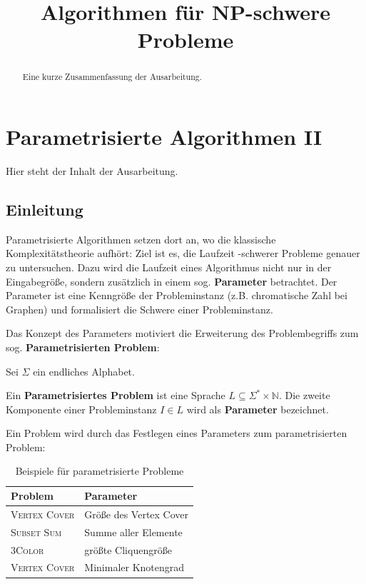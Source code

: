 \documentclass[a4paper,ngerman]{atseminar}
\title{Algorithmen für NP-schwere Probleme}
\author{}
\newcommand{\N}{\ensuremath{\mathbb{N}}\xspace}
\begin{document}
\maketitle

\GERMAN

\section{Parametrisierte Algorithmen II}

\begin{abstract}
Eine kurze Zusammenfassung der Ausarbeitung. 
\end{abstract}

Hier steht der Inhalt der Ausarbeitung.

\subsection{Einleitung}

Parametrisierte Algorithmen setzen dort an, wo die klassische Komplexitätstheorie aufhört: Ziel ist es, die Laufzeit \NP-schwerer Probleme
genauer zu untersuchen.
Dazu wird die Laufzeit eines Algorithmus nicht nur in der Eingabegröße, sondern zusätzlich in einem sog. \textbf{Parameter} betrachtet.
Der Parameter ist eine Kenngröße der Probleminstanz (z.B. chromatische Zahl bei Graphen) und formalisiert die Schwere einer Probleminstanz.

\noindent
Das Konzept des Parameters motiviert die Erweiterung des Problembegriffs zum sog. \textbf{Parametrisierten Problem}:

\begin{definition}
  Sei $\Sigma$ ein endliches Alphabet.

  \noindent
  Ein \textbf{Parametrisiertes Problem} ist eine Sprache $L \subseteq \Sigma^* \times \N$.
  \noindent
  Die zweite Komponente einer Probleminstanz $I \in L$ wird als \textbf{Parameter} bezeichnet.
\end{definition}

\noindent
Ein Problem wird durch das Festlegen eines Parameters zum parametrisierten Problem:

\begin{table}[h]
  \centering
  \caption{Beispiele für parametrisierte Probleme}
  \begin{tabular}{ll}
    \hline
    \textbf{Problem} & \textbf{Parameter} \\
    \hline
    \textsc{Vertex Cover} & Größe des Vertex Cover \\
    \hline
    \textsc{Subset Sum} & Summe aller Elemente \\
    \hline
    \textsc{3Color} & größte Cliquengröße \\
    \hline
    \textsc{Vertex Cover} &  Minimaler Knotengrad \\
    \hline
    
  \end{tabular}
  \label{XY:tab:interessant}
  \end{table}
\end{document}
